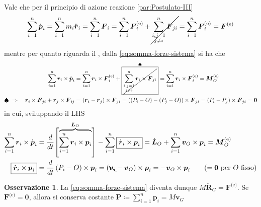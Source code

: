 \documentclass[a4paper,10pt]{article}
\theoremstyle{definition}
\theoremstyle{indentdefinition}
\theoremstyle{indenttheorem}
\theoremstyle{myremark}
\newtheorem*{rem*}{Osservazione}
\theoremstyle{indentgeneral}
\begin{document}
Vale che per il principio di azione reazione \eqref{par:Postulato-III}
\begin{equation}
\sum_{i=1}^{n}\dot{\boldsymbol{p}}_{i}=\sum_{i=1}^{n}m_{i}\ddot{\boldsymbol{r}}_{i}=\sum_{i=1}^{n}\boldsymbol{F}_{i}=\sum_{i=1}^{n}\boldsymbol{F}_{i}^{\text{(e)}}+\cancel{\sum_{\substack{i,j=1\\
j\neq i
}
}^{n}\boldsymbol{F}_{ji}}=\sum_{i=1}^{n}\boldsymbol{F}_{i}^{\text{(e)}}=\boldsymbol{F}^{\text{(e)}}\label{eq:somma-forze-sistema}
\end{equation}
mentre per quanto riguarda il , dalla
\ref{eq:somma-forze-sistema} si ha che
\begin{align*}
\sum_{i=1}^{n}\boldsymbol{r}_{i}\times\dot{\boldsymbol{p}}_{i} & =\sum_{i=1}^{n}\boldsymbol{r}_{i}\times\boldsymbol{F}_{i}^{\text{(e)}}+\overset{\spadesuit}{\boxed{\cancel{\sum_{\substack{i,j=1\\
j\neq i
}
}^{n}\boldsymbol{r}_{i}\times\boldsymbol{F}_{ji}}}}=\sum_{i=1}^{n}\boldsymbol{r}_{i}\times\boldsymbol{F}_{i}^{\text{(e)}}=\boldsymbol{M}_{O}^{\text{(e)}}\\
\spadesuit\;\Rightarrow\quad\boldsymbol{r}_{i}\times\boldsymbol{F}_{ji}+\boldsymbol{r}_{j}\times\boldsymbol{F}_{ij} & =\left(\boldsymbol{r}_{i}-\boldsymbol{r}_{j}\right)\times\boldsymbol{F}_{ji}=\left(\left(P_{i}-O\right)-\left(P_{j}-O\right)\right)\times\boldsymbol{F}_{ji}=\left(P_{i}-P_{j}\right)\times\boldsymbol{F}_{ji}=\boldsymbol{0}
\end{align*}
in cui, sviluppando il LHS
\begin{align*}
\sum_{i=1}^{n}\boldsymbol{r}_{i}\times\dot{\boldsymbol{p}}_{i} & =\frac{d}{dt}\overset{\boldsymbol{L}_{O}}{\left[\overbrace{\sum_{i=1}^{n}\boldsymbol{r}_{i}\times\boldsymbol{p}_{i}}\right]}-\sum_{i=1}^{n}\boxed{\dot{\boldsymbol{r}}_{i}\times\boldsymbol{p}_{i}}=\dot{\boldsymbol{L}}_{O}+\sum_{i=1}^{n}\boldsymbol{v}_{O}\times\boldsymbol{p}_{i}=\boldsymbol{M}_{O}^{\text{(e)}}\\
\boxed{\dot{\boldsymbol{r}}_{i}\times\boldsymbol{p}_{i}} & =\frac{d}{dt}\left(P_{i}-O\right)\times\boldsymbol{p}_{i}=\left(\bcancel{\boldsymbol{v}_{i}}-\boldsymbol{v}_{O}\right)\times\boldsymbol{p}_{i}=-\boldsymbol{v}_{O}\times\boldsymbol{p}_{i}\qquad\text{(\ensuremath{=\boldsymbol{0}} per \ensuremath{O} fisso)}
\end{align*}



\begin{rem*}
La \ref{eq:somma-forze-sistema} diventa dunque $M\ddot{\boldsymbol{R}}_{G}=\boldsymbol{F}^{\text{(e)}}$.
Se $\boldsymbol{F}^{\text{(e)}}=\boldsymbol{0}$, allora si conserva
costante $\boldsymbol{P}\coloneqq\sum_{i=1}^{n}\boldsymbol{p}_{i}=M\boldsymbol{v}_{G}$
\end{rem*}
\end{document}
